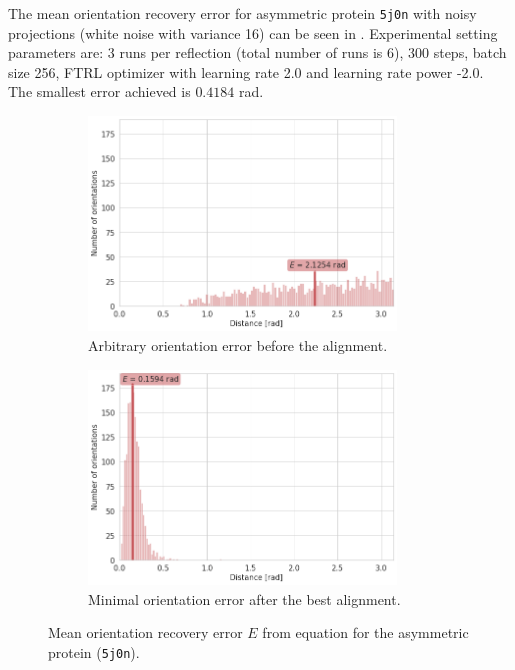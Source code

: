 The mean orientation recovery error for asymmetric protein \texttt{5j0n} with noisy projections (white noise with variance 16) can be seen in . Experimental setting parameters are: 3 runs per reflection (total number of runs is 6), 300 steps, batch size 256, FTRL optimizer with learning rate 2.0 and learning rate power -2.0. The smallest error achieved is $0.4184$ rad.

\begin{figure}
    \centering
    \begin{subfigure}[b]{0.45\textwidth}
        \includegraphics[height=5.7cm]{images/5j0n_noise0_angle_alignment_before.png}
        \caption{Arbitrary orientation error before the alignment.}
    \end{subfigure}
    \hfill
    \begin{subfigure}[b]{0.5\textwidth}
    \centering
        \includegraphics[height=5.7cm]{images/5j0n_noise0_angle_alignment_after.png}
        \caption{Minimal orientation error after the best alignment.}
    \end{subfigure}
    \caption{
        Mean orientation recovery error $E$ from equation  for the asymmetric protein (\texttt{5j0n}).
    }
    \label{fig:angle-alignment-5j0n-noise0}
\end{figure}


